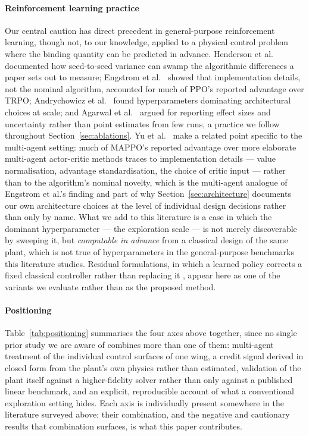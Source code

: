 \documentclass[preprint,11pt,authoryear]{elsarticle}
\begin{document}
\paragraph{Reinforcement learning practice}
Our central caution has direct precedent in general-purpose reinforcement
learning, though not, to our knowledge, applied to a physical control problem
where the binding quantity can be predicted in advance. Henderson et al.\
\citep{henderson2018matters} documented how seed-to-seed variance can swamp the
algorithmic differences a paper sets out to measure; Engstrom et al.\
\citep{engstrom2020implementation} showed that implementation details, not the
nominal algorithm, accounted for much of PPO's reported advantage over TRPO;
Andrychowicz et al.\ \citep{andrychowicz2021what} found hyperparameters
dominating architectural choices at scale; and Agarwal et al.\
\citep{agarwal2021precipice} argued for reporting effect sizes and uncertainty
rather than point estimates from few runs, a practice we follow throughout
Section~\ref{sec:ablations}. Yu et al.\ \citep{yu2022mappo} make a related point
specific to the multi-agent setting: much of MAPPO's reported advantage over
more elaborate multi-agent actor-critic methods traces to implementation
details --- value normalisation, advantage standardisation, the choice of
critic input --- rather than to the algorithm's nominal novelty, which is the
multi-agent analogue of Engstrom et al.'s finding and part of why
Section~\ref{sec:architecture} documents our own architecture choices at the
level of individual design decisions rather than only by name. What we add to
this literature is a case in which the dominant hyperparameter --- the
exploration scale --- is not merely discoverable by sweeping it, but
\emph{computable in advance} from a classical design of the same plant, which
is not true of hyperparameters in the general-purpose benchmarks this
literature studies. Residual formulations, in which a learned policy corrects a
fixed classical controller rather than replacing it
\citep{johannink2019residual,silver2018residual}, appear here as one of the
variants we evaluate rather than as the proposed method.

\paragraph{Positioning}
Table~\ref{tab:positioning} summarises the four axes above together, since no
single prior study we are aware of combines more than one of them: multi-agent
treatment of the individual control surfaces of one wing, a credit signal
derived in closed form from the plant's own physics rather than estimated,
validation of the plant itself against a higher-fidelity solver rather than
only against a published linear benchmark, and an explicit, reproducible
account of what a conventional exploration setting hides. Each axis is
individually present somewhere in the literature surveyed above; their
combination, and the negative and cautionary results that combination
surfaces, is what this paper contributes.
\end{document}

